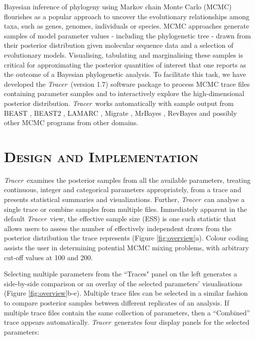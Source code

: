 \documentclass[webpdf,mynatbib,nosurname,nogrid,noCE,noMSC]{SYS}
\newcommand{\tracer}{\emph{Tracer}}
\begin{document}
\indent Bayesian inference of phylogeny using Markov chain Monte Carlo (MCMC) \citep{rannala1996probability, mau1999bayesian, drummond2002estimating} flourishes as a popular approach to uncover the evolutionary relationships among taxa, such as genes, genomes, individuals or species.
MCMC approaches generate samples of model parameter values - including the phylogenetic tree - drawn from their posterior distribution given molecular sequence data and a selection of evolutionary models.
Visualising, tabulating and marginalising these samples is critical for approximating the posterior quantities of interest that one reports as the outcome of a Bayesian phylogenetic analysis.
To facilitate this task, we have developed the \tracer\ (version 1.7) software package to
process MCMC trace files containing parameter samples and to interactively explore the high-dimensional posterior distribution.
\tracer\ works automatically with sample output from BEAST \citep{drummond2012bayesian}, BEAST2 \citep{bouckaert2014beast2},  LAMARC \citep{kuhner2006lamarc},  Migrate \citep{beerli2006comparison}, MrBayes \citep{ronquist2012mrbayes}, RevBayes \citep{hohna2016revbayes} and possibly other MCMC programs from other domains.

\vspace{-2em}
\section*{\textsc{Design and Implementation}}

\tracer\ examines the posterior samples from all the available parameters, treating continuous, integer and categorical parameters appropriately,
from a trace
and presents statistical summaries and visualizations.
Further, \tracer\ can analyse a single trace or combine samples from multiple files.
Immediately apparent in the default \tracer\ view, the effective sample size (ESS) is one such statistic that
allows users to assess the number of effectively independent draws from the posterior distribution the trace represents (Figure \ref{fig:overview}a).
Colour coding assists the user in determining potential MCMC mixing problems, with arbitrary cut-off values at 100 and 200.

Selecting multiple parameters from the ``Traces" panel on the left generates a side-by-side comparison or an overlay of the selected parameters' visualisations (Figure \ref{fig:overview}b-e).
Multiple trace files can be selected in a similar fashion to compare posterior samples between different replicates of an analysis.
If multiple trace files contain the same collection of parameters,  then a ``Combined'' trace appears automatically.
\tracer\ generates four display panels for the selected parameters:
\end{document}
